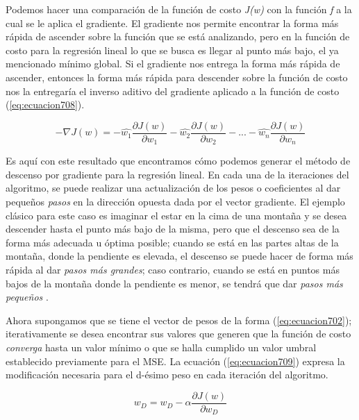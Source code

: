 Podemos hacer una comparación de la función de costo \textit{J(w)} con la función \textit{f} a la cual se le aplica el gradiente. El gradiente nos permite encontrar la forma más rápida de ascender sobre la función que se 
está analizando, pero en la función de costo para la regresión lineal lo que se busca es llegar al punto más bajo, el ya mencionado mínimo global. Si el gradiente nos entrega la forma más rápida de ascender, entonces la 
forma más rápida para descender sobre la función de costo nos la entregaría el inverso aditivo del gradiente aplicado a la función de costo (\ref{eq:ecuacion708}).

\begin{equation}
	- \nabla{J(w)}= - \hat{w_1} \frac{\partial{J(w)}}{\partial{w_1}} - \hat{w_2} \frac{\partial{J(w)}}{\partial{w_2}} - ... - \hat{w_n} \frac{\partial{J(w)}}{\partial{w_n}} 
	\label{eq:ecuacion708}
\end{equation}

Es aquí con este resultado que encontramos cómo podemos generar el método de descenso por gradiente para la regresión lineal. En cada una de la iteraciones del algoritmo, se puede realizar una actualización de los pesos o 
coeficientes al dar pequeños \textit{pasos} en la dirección opuesta dada por el vector gradiente. El ejemplo clásico para este caso es imaginar el estar en la cima de una montaña y se desea descender hasta el punto más 
bajo de la misma, pero que el descenso sea de la forma más adecuada u óptima posible; cuando se está en las partes altas de la montaña, donde la pendiente es elevada, el descenso se puede hacer de forma más rápida al dar 
\textit{pasos más grandes}; caso contrario, cuando se está en puntos más bajos de la montaña donde la pendiente es menor, se tendrá que dar \textit{pasos más pequeños} \cite{PinedaPertuzML}.

Ahora supongamos que se tiene el vector de pesos de la forma (\ref{eq:ecuacion702}); iterativamente se desea encontrar sus valores que generen que la función de costo \textit{converga} hasta un valor mínimo o que se halla 
cumplido un valor umbral establecido previamente para el MSE. La ecuación (\ref{eq:ecuacion709}) expresa la modificación necesaria para el d-ésimo peso en cada iteración del algoritmo.

\begin{equation}
	w_D = w_D - \alpha \frac{\partial{J(w)}}{\partial{w_D}}
	\label{eq:ecuacion709}
\end{equation}

